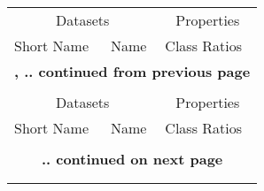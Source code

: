 {\tiny
	\begin{longtable}{|ll|p{17cm}|}

		\hline
		\multicolumn{2}{|c}{Datasets} & \multicolumn{1}{|c|}{Properties} \\
		Short Name & Name & Class Ratios \\
		\hline
		\endfirsthead

		\multicolumn{3}{c}{\bfseries \tablename \thetable{}, .. continued from previous page} \\
		\multicolumn{3}{c}{} \\
		\hline
		\multicolumn{2}{|c}{Datasets} & \multicolumn{1}{|c|}{Properties} \\
		Short Name & Name & Class Ratios \\
		\hline
		\endhead

		\multicolumn{3}{c}{} \\
		\multicolumn{3}{c}{\bfseries  .. continued on next page} \\
		\endfoot

		\multicolumn{3}{c}{} \\
		\endlastfoot


\end{longtable}}
